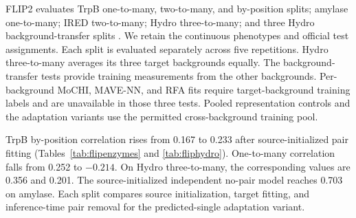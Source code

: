 \documentclass{llncs}
\begin{document}
FLIP2 evaluates TrpB one-to-many, two-to-many, and by-position splits; amylase one-to-many; IRED two-to-many; Hydro three-to-many; and three Hydro background-transfer splits \citep{didi2026}. We retain the continuous phenotypes and official test assignments. Each split is evaluated separately across five repetitions. Hydro three-to-many averages its three target backgrounds equally. The background-transfer tests provide training measurements from the other backgrounds. Per-background MoCHI, MAVE-NN, and RFA fits require target-background training labels and are unavailable in those three tests. Pooled representation controls and the adaptation variants use the permitted cross-background training pool.

TrpB by-position correlation rises from 0.167 to 0.233 after source-initialized pair fitting (Tables~\ref{tab:flipenzymes} and \ref{tab:fliphydro}). One-to-many correlation falls from 0.252 to $-0.214$. On Hydro three-to-many, the corresponding values are 0.356 and 0.201. The source-initialized independent no-pair model reaches 0.703 on amylase. Each split compares source initialization, target fitting, and inference-time pair removal for the predicted-single adaptation variant.
\end{document}
